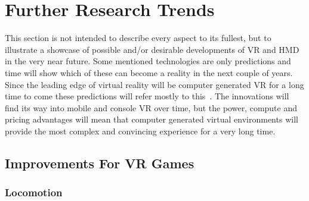 \section{Further Research Trends}

This section is not intended to describe every aspect to its fullest, but to illustrate a showcase of possible and/or desirable developments of VR and HMD in the very near future. \newline
Some mentioned technologies are only predictions and time will show which of these can become a reality in the next couple of years. \newline
Since the leading edge of virtual reality will be computer generated VR for a long time to come these predictions will refer mostly to this~\cite{online:oculusKeynote}. The innovations will find its way into mobile and console VR over time, but the power, compute and pricing advantages will mean that computer generated virtual environments will provide the most complex and convincing experience for a very long time.

\subsection{Improvements For VR Games}
\subsubsection{Locomotion}
\label{sec:locomotion}

